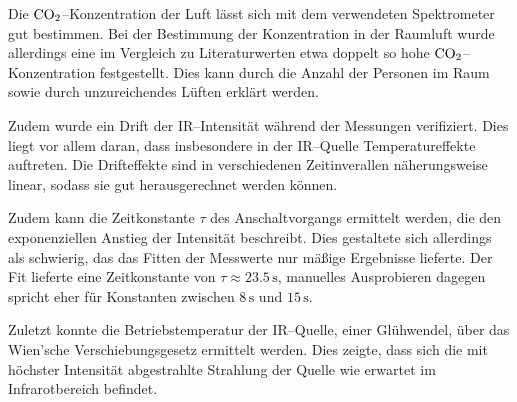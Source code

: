 \documentclass[12pt,a4paper]{scrartcl}
\numberwithin{equation}{section} %
\begin{document}
Die $\ce{CO_2}$--Konzentration der Luft lässt sich mit dem verwendeten Spektrometer gut bestimmen. Bei der Bestimmung der Konzentration in der Raumluft wurde allerdings eine im Vergleich zu Literaturwerten etwa doppelt so hohe $\ce{CO_2}$--Konzentration festgestellt. Dies kann durch die Anzahl der Personen im Raum sowie durch unzureichendes Lüften erklärt werden.

Zudem wurde ein Drift der IR--Intensität während der Messungen verifiziert. Dies liegt vor allem daran, dass insbesondere in der IR--Quelle Temperatureffekte auftreten. Die Drifteffekte sind in verschiedenen Zeitinverallen näherungsweise linear, sodass sie gut herausgerechnet werden können.

Zudem kann die Zeitkonstante $\tau$ des Anschaltvorgangs ermittelt werden, die den exponenziellen Anstieg der Intensität beschreibt. Dies gestaltete sich allerdings als schwierig, das das Fitten der Messwerte nur mäßige Ergebnisse lieferte. Der Fit lieferte eine Zeitkonstante von $\tau\approx23.5\mathrm{\,s}$, manuelles Ausprobieren dagegen spricht eher für Konstanten zwischen $8\mathrm{\,s}$ und $15\mathrm{\,s}$.

Zuletzt konnte die Betriebstemperatur der IR--Quelle, einer Glühwendel, über das Wien'sche Verschiebungsgesetz ermittelt werden. Dies zeigte, dass sich die mit höchster Intensität abgestrahlte Strahlung der Quelle wie erwartet im Infrarotbereich befindet.
\end{document}

